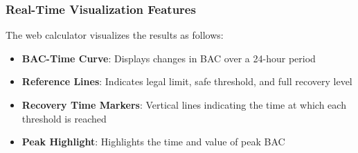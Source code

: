 \documentclass[11pt]{article}
\begin{document}
\subsubsection{Real-Time Visualization Features}

The web calculator visualizes the results as follows:

\begin{itemize}
    \item \textbf{BAC-Time Curve}: Displays changes in BAC over a 24-hour period
    \item \textbf{Reference Lines}: Indicates legal limit, safe threshold, and full recovery level
    \item \textbf{Recovery Time Markers}: Vertical lines indicating the time at which each threshold is reached
    \item \textbf{Peak Highlight}: Highlights the time and value of peak BAC
\end{itemize}









\end{document}
